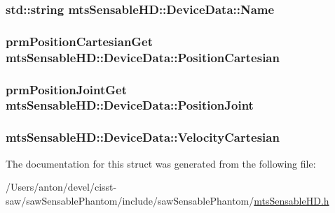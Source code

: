 \subsubsection[{Name}]{\setlength{\rightskip}{0pt plus 5cm}std\+::string mts\+Sensable\+H\+D\+::\+Device\+Data\+::\+Name}\label{structmts_sensable_h_d_1_1_device_data_aa1b15a9026612af14c0b37cca2deb4f2}
\hypertarget{structmts_sensable_h_d_1_1_device_data_a4d969029290b854322a3c4f4f94e37c8}{}
\subsubsection[{Position\+Cartesian}]{\setlength{\rightskip}{0pt plus 5cm}prm\+Position\+Cartesian\+Get mts\+Sensable\+H\+D\+::\+Device\+Data\+::\+Position\+Cartesian}\label{structmts_sensable_h_d_1_1_device_data_a4d969029290b854322a3c4f4f94e37c8}
\hypertarget{structmts_sensable_h_d_1_1_device_data_a3c3a873384119db3e76de8b622240193}{}
\subsubsection[{Position\+Joint}]{\setlength{\rightskip}{0pt plus 5cm}prm\+Position\+Joint\+Get mts\+Sensable\+H\+D\+::\+Device\+Data\+::\+Position\+Joint}\label{structmts_sensable_h_d_1_1_device_data_a3c3a873384119db3e76de8b622240193}
\hypertarget{structmts_sensable_h_d_1_1_device_data_a2878f540b39f0f5bce4ad8e82f446fdf}{}
\subsubsection[{Velocity\+Cartesian}]{ mts\+Sensable\+H\+D\+::\+Device\+Data\+::\+Velocity\+Cartesian}\label{structmts_sensable_h_d_1_1_device_data_a2878f540b39f0f5bce4ad8e82f446fdf}


The documentation for this struct was generated from the following file\+:\begin{DoxyCompactItemize}
\item 
/\+Users/anton/devel/cisst-\/saw/saw\+Sensable\+Phantom/include/saw\+Sensable\+Phantom/\hyperlink{mts_sensable_h_d_8h}{mts\+Sensable\+H\+D.\+h}\end{DoxyCompactItemize}
